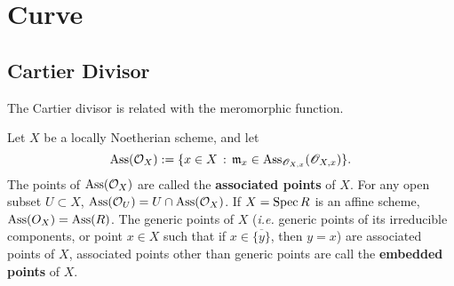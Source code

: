 \chapter{Curve}

\section{Cartier Divisor}

The Cartier divisor is related with the meromorphic function.

\begin{defi}
Let $X$ be a locally Noetherian scheme, and let
\[
	\operatorname{Ass}(\mathcal O_X) := \{ x\in X\,:\,
		\mathfrak m_x\in \operatorname{Ass}_{\mathscr O_{X,x}}(\mathscr O_{X,x})
	\}.
\]
The points of $\operatorname{Ass}(\mathcal O_X)$ are called the \textbf{associated points} 
of $X$. For any open subset $U\subset X$, $\operatorname{Ass}(\mathcal O_U)=U\cap \operatorname{Ass}(\mathcal O_X)$.
If $X=\operatorname{Spec} R$ is an affine scheme, $\operatorname{Ass}(O_X)=\operatorname{Ass}(R)$.
The generic points of $X$ (\emph{i.e.} generic points of its irreducible components, or 
point $x\in X$ such that if $x\in \overline{\{y\}}$, then $y=x$) 
are associated points of $X$, associated points other than
generic points are call the \textbf{embedded points} of $X$.
\end{defi} 



